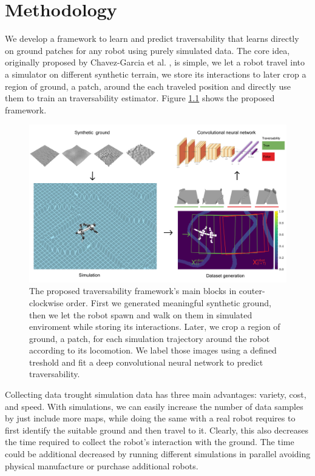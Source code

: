 \documentclass[../document.tex]{subfiles}
\begin{document}
\chapter{Methodology}
We develop a framework to learn and predict traversability that learns directly on ground patches for any robot using purely simulated data. The core idea, originally proposed by Chavez-Garcia et al. \cite{omar2018traversability}, is simple, we let a robot travel into a simulator on different synthetic terrain, we store its interactions to later crop a region of ground, a patch, around the each traveled position and directly use them to train an traversability estimator. Figure \ref{fig : pipeline} shows the proposed framework.
\begin{figure}[H]
    \centering
        \includegraphics[width=\textwidth]{../img/method.png}
    \caption{The proposed traversability framework's main blocks in couter-clockwise order. First we generated meaningful synthetic ground, then we let the robot spawn and walk on them in simulated enviroment while storing its interactions. Later, we crop a region of ground, a patch, for each simulation trajectory around the robot according to its locomotion. We label those images using a defined treshold and fit a deep convolutional neural network to predict traversability. }
    \label{fig : pipeline}
    \end{figure}
Collecting data trought simulation data has three main advantages: variety, cost, and speed. With simulations, we can easily increase the number of data samples by just include more maps, while doing the same with a real robot requires to first identify the suitable ground and then travel to it. Clearly, this also decreases the time required to collect the robot's interaction with the ground. The time could be additional decreased by running different simulations in parallel avoiding physical manufacture or purchase additional robots. 
\end{document}
